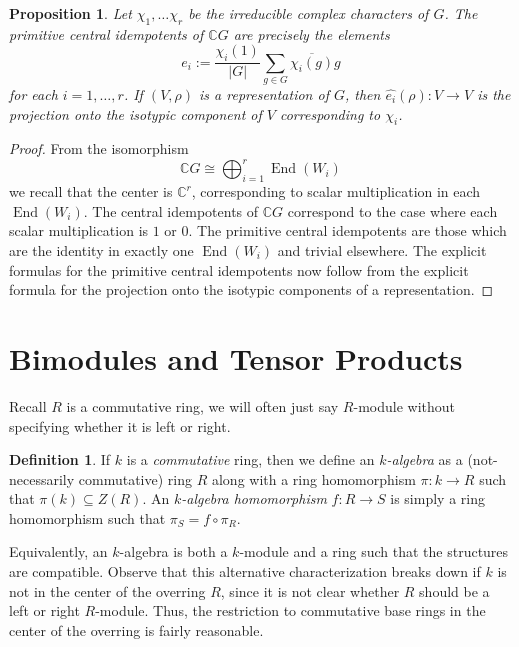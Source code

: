 \documentclass[12pt]{article}
\theoremstyle{plain}
\newtheorem{proposition}[theorem]{Proposition}
\theoremstyle{definition}
\newtheorem{definition}[theorem]{Definition}
\theoremstyle{remark}
\numberwithin{equation}{section}
\begin{document}
\begin{proposition}
Let $\chi_1,\ldots \chi_r$ be the irreducible complex characters of $G$.
The primitive central idempotents of $\mathbb{C}G$ are precisely
the elements
\[
e_i := \frac{\chi_i(1)}{|G|} \sum_{g\in G} \overline{\chi_i(g)} g
\]
for each $i=1,\ldots,r$.
If $(V,\rho)$ is a representation of $G$, then
$\widehat{e_i}(\rho) : V \to V$ is the projection onto the isotypic
component of $V$ corresponding to $\chi_i$.
\end{proposition}

\begin{proof}
From the isomorphism
\[
\mathbb{C}G \cong \bigoplus_{i=1}^r \operatorname{End}(W_i)
\]
we recall that the center is $\mathbb{C}^r$,
corresponding to scalar multiplication in each
$\operatorname{End}(W_i)$.
The central idempotents of $\mathbb{C}G$
correspond to the case where each scalar multiplication is $1$ or $0$.
The primitive central idempotents are those which are the identity
in exactly one $\operatorname{End}(W_i)$ and trivial elsewhere.
The explicit formulas for the primitive central idempotents now follow
from the explicit formula for the projection onto the isotypic
components of a representation. 
\end{proof}

\section{Bimodules and Tensor Products}

Recall $R$ is a commutative ring, we will often just say $R$-module without
specifying whether it is left or right.

\begin{definition}
If $k$ is a \emph{commutative} ring, then we define an
\emph{$k$-algebra} as a (not-necessarily commutative) ring $R$ along
with a ring homomorphism $\pi : k \to R$ such that $\pi(k) \subseteq Z(R)$.
An \emph{$k$-algebra homomorphism} $f : R \to S$ is simply a ring
homomorphism such that $\pi_S = f \circ \pi_R$.
\end{definition}

Equivalently, an $k$-algebra is both a $k$-module and a ring such
that the structures are compatible.
Observe that this alternative characterization breaks down if $k$ is not
in the center of the overring $R$, since it is not clear whether
$R$ should be a left or right $R$-module.
Thus, the restriction to commutative base rings in the center of the
overring is fairly reasonable.
\end{document}
